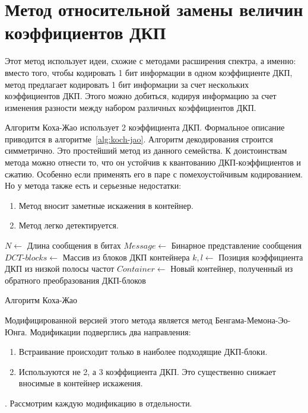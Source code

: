 \section{Метод относительной замены величин коэффициентов ДКП}
Этот метод использует идеи, схожие с методами расширения спектра, а именно:
вместо того, чтобы кодировать 1 бит информации в одном коэффициенте ДКП,
метод предлагает кодировать 1 бит информации за счет нескольких коэффициентов ДКП.
Этого можно добиться, кодируя информацию за счет изменения разности между
набором различных коэффициентов ДКП.

Алгоритм Коха-Жао использует 2 коэффициента ДКП.
Формальное описание приводится в алгоритме~\ref{alg:koch-jao}.
Алгоритм декодирования строится симметрично.
Это простейший метод из данного семейства. К доистоинствам
метода можно отнести то, что он устойчив к квантованию ДКП-коэффициентов
и сжатию. Особенно если применять его в паре с помехоустойчивым кодированием.
Но у метода также есть и серьезные недостатки:
\begin{enumerate}
    \item Метод вносит заметные искажения в контейнер.
    \item Метод легко детектируется.
\end{enumerate}

\begin{algorithm}[ht!]
     $N \leftarrow$ Длина сообщения в битах\;
     $Message \leftarrow$ Бинарное представление сообщения\;
     $DCT$-$blocks \leftarrow$ Массив из блоков ДКП контейнера\;
     $k, l \leftarrow$ Позиция коэффициента ДКП из низкой полосы частот\;
     $Container \leftarrow$ Новый контейнер, полученный из обратного преобразования ДКП-блоков\;
     \caption{Алгоритм Коха-Жао}
    \label{alg:koch-jao}
\end{algorithm}

Модифицированной версией этого метода является метод Бенгама-Мемона-Эо-Юнга.
Модификации подверглись два направления:
\begin{enumerate}
    \item Встраивание происходит только в наиболее подходящие ДКП-блоки.
    \item Используются не 2, а 3 коэффициента ДКП. Это существенно снижает
    вносимые в контейнер искажения.
\end{enumerate}.
Рассмотрим каждую модификацию в отдельности.

